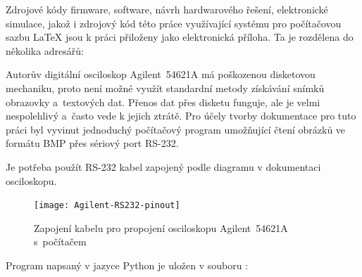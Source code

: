 \appendix
{}


Zdrojové kódy firmware, software, návrh hardwarového řešení, elektronické
simulace, jakož i zdrojový kód této práce využívající systému pro počítačovou
sazbu \LaTeX{} jsou k práci přiloženy jako elektronická příloha. Ta je rozdělena
do několika adresářů:



\clearpage
{}
Autorův digitální osciloskop Agilent~54621A má poškozenou disketovou mechaniku,
proto není možné využít standardní metody získávání snímků obrazovky
a~textových dat. Přenos dat přes disketu funguje, ale je velmi nespolehlivý
a~často vede k jejich ztrátě. Pro účely tvorby dokumentace pro tuto práci byl
vyvinut jednoduchý počítačový program umožňující čtení obrázků ve formátu BMP
přes sériový port RS-232.

Je potřeba použít RS-232 kabel zapojený podle diagramu v dokumentaci
osciloskopu.

\begin{figure}[htbp]
    \centering
    \texttt{[image: Agilent-RS232-pinout]}
    \caption{%
        Zapojení kabelu pro propojení osciloskopu Agilent~54621A
        s~počítačem~\cite{Agilent54621Auser}
    }
    \label{fig:agilent RS232 pinout}
\end{figure}

Program napsaný v jazyce Python je uložen v souboru :


